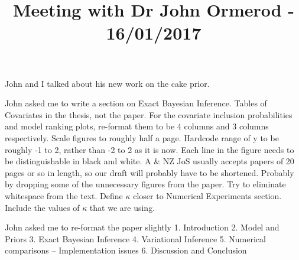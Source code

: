 \documentclass{amsart}
\title{Meeting with Dr John Ormerod - 16/01/2017}
\begin{document}
\maketitle

John and I talked about his new work on the cake prior.

John asked me to write a section on Exact Bayesian Inference.
Tables of Covariates in the thesis, not the paper.
For the covariate inclusion probabilities and model ranking plots, re-format them to be 4 columns and
3 columns respectively.
Scale figures to roughly half a page.
Hardcode range of y to be roughly -1 to 2, rather than -2 to 2 as it is now.
Each line in the figure needs to be distinguishable in black and white.
A \& NZ JoS usually accepts papers of 20 pages or so in length, so our draft will probably have to be 
shortened. Probably by dropping some of the unnecessary figures from the paper.
Try to eliminate whitespace from the text.
Define $\kappa$ closer to Numerical Experiments section. Include the values of $\kappa$ that we are using.

John asked me to re-format the paper slightly
1. Introduction
2. Model and Priors
3. Exact Bayesian Inference
4. Variational Inference
5. Numerical comparisons -- Implementation issues
6. Discussion  and Conclusion
\end{document}
